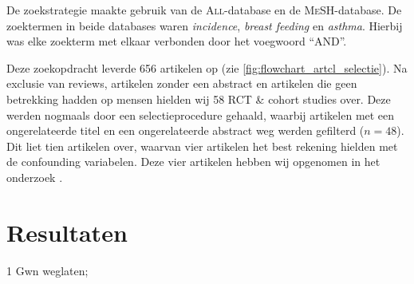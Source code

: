 \documentclass[abstract=true]{scrartcl}
\begin{document}
    De zoekstrategie maakte gebruik van de \textsc{All}-database en de \textsc{MeSH}-database. De zoektermen in beide databases waren \emph{incidence}, \emph{breast feeding} en \emph{asthma}. Hierbij was elke zoekterm met elkaar verbonden door het voegwoord ``\uppercase{and}''.

Deze zoekopdracht leverde 656 artikelen op (zie \cref{fig:flowchart_artcl_selectie}). Na exclusie van reviews, artikelen zonder een abstract en artikelen die geen betrekking hadden op mensen hielden wij 58 RCT \& cohort studies over. Deze werden nogmaals door een selectieprocedure gehaald, waarbij artikelen met een ongerelateerde titel en een ongerelateerde abstract weg werden gefilterd ($n = 48$).
Dit liet tien artikelen over, waarvan vier artikelen het best rekening hielden met de confounding variabelen. Deze vier artikelen hebben wij opgenomen in het onderzoek \cite{chandra1997five,den_Dekker_2016,oddy1999association,dell2001breastfeeding}.



\section{Resultaten}
\begin{table}
   \centering
   \begin{threeparttable}
\begin{tablenotes}
\item[1]Gwn weglaten;
\end{tablenotes}

\end{threeparttable}
\label{tab:overzicht_artcls}
\end{table}
\end{document}
